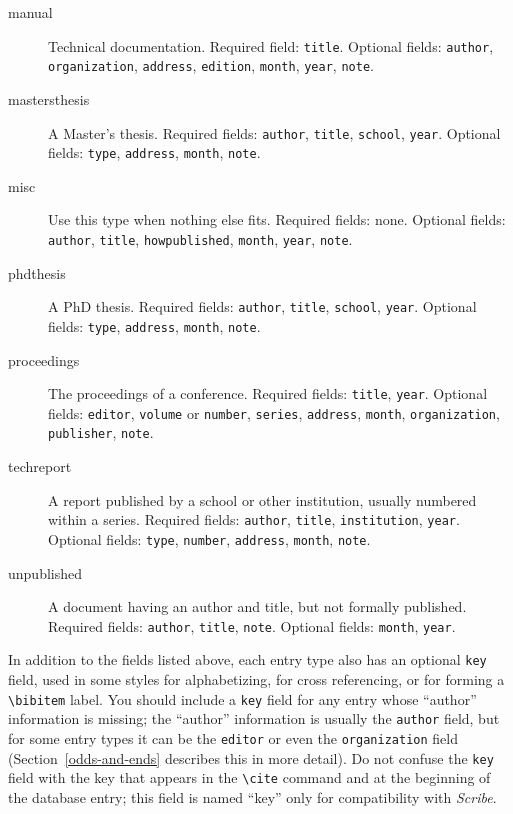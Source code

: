 \begin{description}
\item[manual\hfill] Technical documentation.  Required field: \hbox{\tt title}.
Optional fields: \hbox{\tt author}, \hbox{\tt organization},
\hbox{\tt address}, \hbox{\tt edition}, \hbox{\tt month}, \hbox{\tt year},
\hbox{\tt note}.

\item[mastersthesis\hfill] A Master's thesis.
Required fields: \hbox{\tt author}, \hbox{\tt title}, \hbox{\tt school},
\hbox{\tt year}.
Optional fields: \hbox{\tt type}, \hbox{\tt address}, \hbox{\tt month},
\hbox{\tt note}.

\item[misc\hfill] Use this type when nothing else fits.
Required fields: none.
Optional fields: \hbox{\tt author}, \hbox{\tt title}, \hbox{\tt howpublished},
\hbox{\tt month}, \hbox{\tt year}, \hbox{\tt note}.

\item[phdthesis\hfill] A PhD thesis.
Required fields: \hbox{\tt author}, \hbox{\tt title}, \hbox{\tt school},
\hbox{\tt year}.
Optional fields: \hbox{\tt type}, \hbox{\tt address}, \hbox{\tt month},
\hbox{\tt note}.

\item[proceedings\hfill] The proceedings of a conference.
Required fields: \hbox{\tt title}, \hbox{\tt year}.
Optional fields: \hbox{\tt editor}, \hbox{\tt volume} or \hbox{\tt number},
\hbox{\tt series}, \hbox{\tt address}, \hbox{\tt month},
\hbox{\tt organization}, \hbox{\tt publisher}, \hbox{\tt note}.


\item[techreport\hfill] A report published by a school or other institution,
usually numbered within a series.
Required fields: \hbox{\tt author},
\hbox{\tt title}, \hbox{\tt institution}, \hbox{\tt year}.
Optional fields: \hbox{\tt type}, \hbox{\tt number}, \hbox{\tt address},
\hbox{\tt month}, \hbox{\tt note}.

\item[unpublished\hfill] A document having an author and title,
but not formally published.
Required fields: \hbox{\tt author}, \hbox{\tt title}, \hbox{\tt note}.
Optional fields: \hbox{\tt month}, \hbox{\tt year}.

\end{description}

In addition to the fields listed above, each entry type also has an
optional \hbox{\tt key} field, used in some styles
for alphabetizing, for cross referencing,
or for forming a \hbox{\verb|\bibitem|} label.
You should include a \hbox{\tt key} field for any entry whose
``author'' information is missing;
the ``author'' information is usually the \hbox{\tt author} field,
but for some entry types it can be the \hbox{\tt editor}
or even the \hbox{\tt organization} field
(Section~\ref{odds-and-ends} describes this in more detail).
Do not confuse the \hbox{\tt key} field with the key that appears in the
\hbox{\verb|\cite|} command and at the beginning of the database entry;
this field is named ``key'' only for compatibility with {\it Scribe}.


